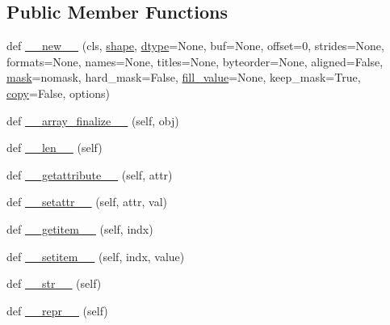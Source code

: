 \subsection*{Public Member Functions}
\begin{DoxyCompactItemize}
\item 
def \hyperlink{classnumpy_1_1ma_1_1mrecords_1_1MaskedRecords_a50fb676c5bd430ed2627afe5c83bb109}{\+\_\+\+\_\+new\+\_\+\+\_\+} (cls, \hyperlink{classnumpy_1_1ma_1_1core_1_1MaskedArray_ae013d7cfa83d232ea0f7e1eff4a0f54b}{shape}, \hyperlink{classnumpy_1_1ma_1_1core_1_1MaskedArray_acaf5e9f1356ae9652fc4eddef5878b18}{dtype}=None, buf=None, offset=0, strides=None, formats=None, names=None, titles=None, byteorder=None, aligned=False, \hyperlink{classnumpy_1_1ma_1_1core_1_1MaskedArray_a7ef4d822649ddda22965ba79c54e0afc}{mask}=nomask, hard\+\_\+mask=False, \hyperlink{classnumpy_1_1ma_1_1mrecords_1_1MaskedRecords_af679e8a301f29d0593d47399cce90bc9}{fill\+\_\+value}=None, keep\+\_\+mask=True, \hyperlink{classnumpy_1_1ma_1_1mrecords_1_1MaskedRecords_af8828d46015f1ab2db803151727beeb9}{copy}=False, options)
\item 
def \hyperlink{classnumpy_1_1ma_1_1mrecords_1_1MaskedRecords_a1444841fceaecf1db8cd5bb7b09eb75b}{\+\_\+\+\_\+array\+\_\+finalize\+\_\+\+\_\+} (self, obj)
\item 
def \hyperlink{classnumpy_1_1ma_1_1mrecords_1_1MaskedRecords_a6e5d5f879f4d1fa144c4bbdf5ec5efaf}{\+\_\+\+\_\+len\+\_\+\+\_\+} (self)
\item 
def \hyperlink{classnumpy_1_1ma_1_1mrecords_1_1MaskedRecords_a1287993aa8e7a07ea75615c7ecfba9b8}{\+\_\+\+\_\+getattribute\+\_\+\+\_\+} (self, attr)
\item 
def \hyperlink{classnumpy_1_1ma_1_1mrecords_1_1MaskedRecords_a2ff6a789de40c15313905736dab742ad}{\+\_\+\+\_\+setattr\+\_\+\+\_\+} (self, attr, val)
\item 
def \hyperlink{classnumpy_1_1ma_1_1mrecords_1_1MaskedRecords_a3ff3f203b1e470bd1a7d2dce845d6826}{\+\_\+\+\_\+getitem\+\_\+\+\_\+} (self, indx)
\item 
def \hyperlink{classnumpy_1_1ma_1_1mrecords_1_1MaskedRecords_aca2d7ee4a9b2e23911a5f721710bddb1}{\+\_\+\+\_\+setitem\+\_\+\+\_\+} (self, indx, value)
\item 
def \hyperlink{classnumpy_1_1ma_1_1mrecords_1_1MaskedRecords_af2bd0705461307ea59803871c4bfd826}{\+\_\+\+\_\+str\+\_\+\+\_\+} (self)
\item 
def \hyperlink{classnumpy_1_1ma_1_1mrecords_1_1MaskedRecords_a9ae08f75c2641051fcbc321102967ecd}{\+\_\+\+\_\+repr\+\_\+\+\_\+} (self)

\end{DoxyCompactItemize}
